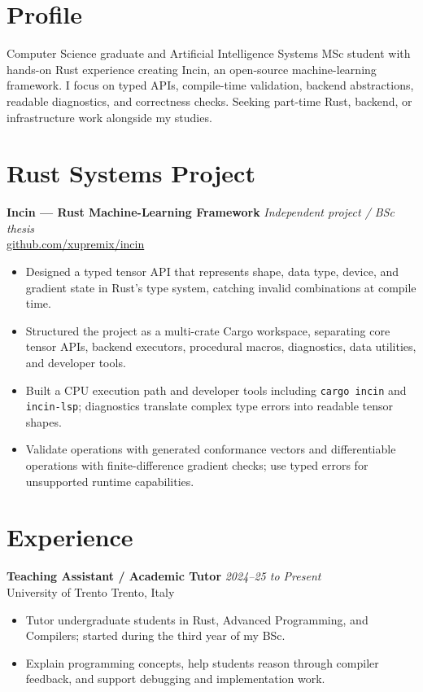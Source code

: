 \documentclass[10pt,a4paper]{article}
\begin{document}

\section{Profile}
Computer Science graduate and Artificial Intelligence Systems MSc student with hands-on Rust experience creating Incin, an open-source machine-learning framework. I focus on typed APIs, compile-time validation, backend abstractions, readable diagnostics, and correctness checks. Seeking part-time Rust, backend, or infrastructure work alongside my studies.

\section{Rust Systems Project}
\noindent\textbf{Incin --- Rust Machine-Learning Framework} \hfill \textsl{Independent project / BSc thesis}\\
\noindent\href{https://github.com/xupremix/incin}{github.com/xupremix/incin}
\begin{itemize}
  \item Designed a typed tensor API that represents shape, data type, device, and gradient state in Rust's type system, catching invalid combinations at compile time.
  \item Structured the project as a multi-crate Cargo workspace, separating core tensor APIs, backend executors, procedural macros, diagnostics, data utilities, and developer tools.
  \item Built a CPU execution path and developer tools including \texttt{cargo incin} and \texttt{incin-lsp}; diagnostics translate complex type errors into readable tensor shapes.
  \item Validate operations with generated conformance vectors and differentiable operations with finite-difference gradient checks; use typed errors for unsupported runtime capabilities.
\end{itemize}

\section{Experience}
\noindent\textbf{Teaching Assistant / Academic Tutor} \hfill \textsl{2024--25 to Present}\\
\noindent University of Trento \hfill Trento, Italy
\begin{itemize}
  \item Tutor undergraduate students in Rust, Advanced Programming, and Compilers; started during the third year of my BSc.
  \item Explain programming concepts, help students reason through compiler feedback, and support debugging and implementation work.
\end{itemize}
\end{document}
